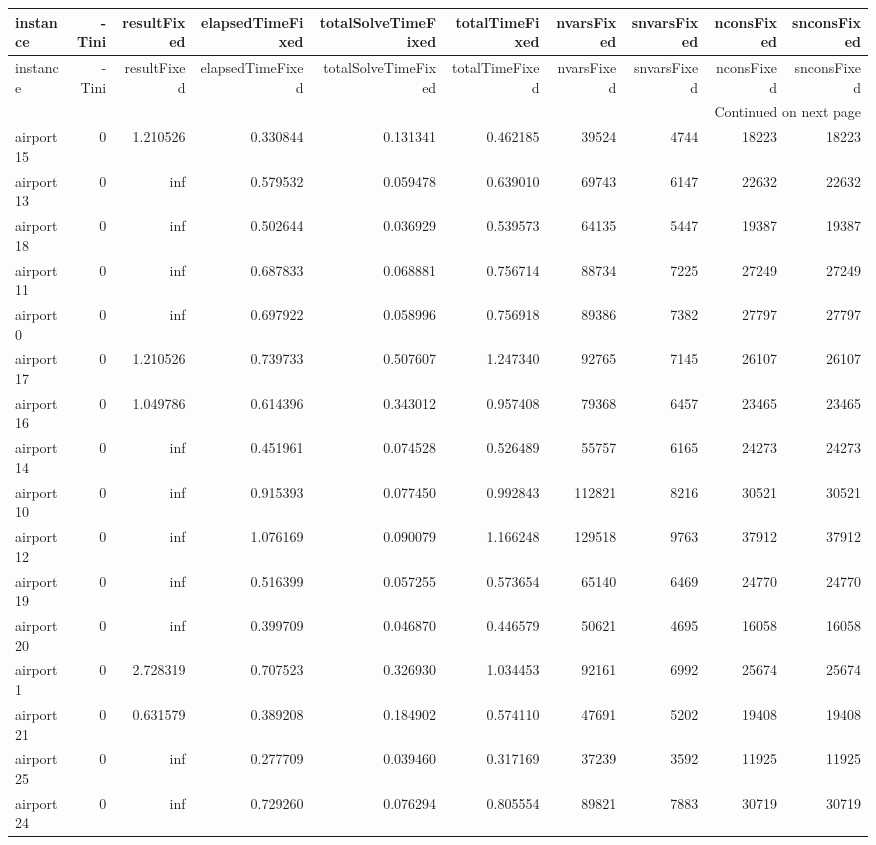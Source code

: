 \documentclass[../../../thesis.tex]{subfiles}
\begin{document}
\tiny
\begin{longtable}{|l|r|r|r|r|r|r|r|r|r|}
\toprule
instance & -Tini & resultFixed & elapsedTimeFixed & totalSolveTimeFixed & totalTimeFixed & nvarsFixed & snvarsFixed & nconsFixed & snconsFixed \\
\midrule
\endfirsthead
\toprule
instance & -Tini & resultFixed & elapsedTimeFixed & totalSolveTimeFixed & totalTimeFixed & nvarsFixed & snvarsFixed & nconsFixed & snconsFixed \\
\midrule
\endhead
\midrule
\multicolumn{10}{r}{Continued on next page} \\
\midrule
\endfoot
\bottomrule
\endlastfoot
airport15 & 0 & 1.210526 & 0.330844 & 0.131341 & 0.462185 & 39524 & 4744 & 18223 & 18223 \\
airport13 & 0 & inf & 0.579532 & 0.059478 & 0.639010 & 69743 & 6147 & 22632 & 22632 \\
airport18 & 0 & inf & 0.502644 & 0.036929 & 0.539573 & 64135 & 5447 & 19387 & 19387 \\
airport11 & 0 & inf & 0.687833 & 0.068881 & 0.756714 & 88734 & 7225 & 27249 & 27249 \\
airport0 & 0 & inf & 0.697922 & 0.058996 & 0.756918 & 89386 & 7382 & 27797 & 27797 \\
airport17 & 0 & 1.210526 & 0.739733 & 0.507607 & 1.247340 & 92765 & 7145 & 26107 & 26107 \\
airport16 & 0 & 1.049786 & 0.614396 & 0.343012 & 0.957408 & 79368 & 6457 & 23465 & 23465 \\
airport14 & 0 & inf & 0.451961 & 0.074528 & 0.526489 & 55757 & 6165 & 24273 & 24273 \\
airport10 & 0 & inf & 0.915393 & 0.077450 & 0.992843 & 112821 & 8216 & 30521 & 30521 \\
airport12 & 0 & inf & 1.076169 & 0.090079 & 1.166248 & 129518 & 9763 & 37912 & 37912 \\
airport19 & 0 & inf & 0.516399 & 0.057255 & 0.573654 & 65140 & 6469 & 24770 & 24770 \\
airport20 & 0 & inf & 0.399709 & 0.046870 & 0.446579 & 50621 & 4695 & 16058 & 16058 \\
airport1 & 0 & 2.728319 & 0.707523 & 0.326930 & 1.034453 & 92161 & 6992 & 25674 & 25674 \\
airport21 & 0 & 0.631579 & 0.389208 & 0.184902 & 0.574110 & 47691 & 5202 & 19408 & 19408 \\
airport25 & 0 & inf & 0.277709 & 0.039460 & 0.317169 & 37239 & 3592 & 11925 & 11925 \\
airport24 & 0 & inf & 0.729260 & 0.076294 & 0.805554 & 89821 & 7883 & 30719 & 30719 \\

\end{longtable}
\end{document}
